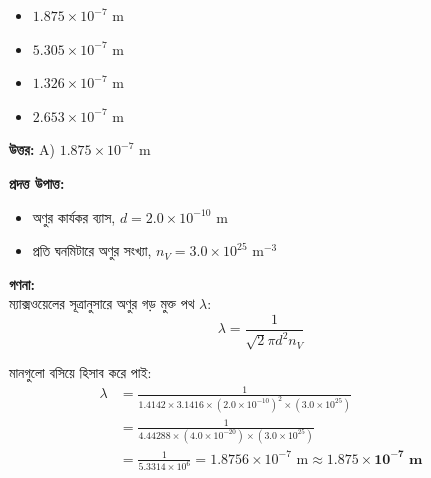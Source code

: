 \documentclass[12pt, a4paper]{article}
\begin{document}
\begin{itemize}[label={}, leftmargin=1cm, itemsep=0.5em]
    \item[\textbf{A)}] $1.875 \times 10^{-7}\text{ m}$
    \item[\textbf{B)}] $5.305 \times 10^{-7}\text{ m}$
    \item[\textbf{C)}] $1.326 \times 10^{-7}\text{ m}$
    \item[\textbf{D)}] $2.653 \times 10^{-7}\text{ m}$
\end{itemize}

\vspace{0.5em}
\begin{tcolorbox}[answerbox]
    \textbf{\color{success} উত্তর:} A) $1.875 \times 10^{-7}\text{ m}$
\end{tcolorbox}
\vspace{1em}

\begin{tcolorbox}[solutionbox={সমাধান (Solution)}]
    \noindent
    \textbf{প্রদত্ত উপাত্ত:}
    \begin{itemize}[leftmargin=1.5em, itemsep=0.2em]
        \item অণুর কার্যকর ব্যাস, $d = 2.0 \times 10^{-10}\text{ m}$
        \item প্রতি ঘনমিটারে অণুর সংখ্যা, $n_V = 3.0 \times 10^{25}\text{ m}^{-3}$
    \end{itemize}

    \vspace{0.6em}
    \noindent\textbf{গণনা:} \\
    ম্যাক্সওয়েলের সূত্রানুসারে অণুর গড় মুক্ত পথ $\lambda$:
    \[ \lambda = \frac{1}{\sqrt{2} \pi d^2 n_V} \]
    
    মানগুলো বসিয়ে হিসাব করে পাই:
    \begin{align*}
        \lambda &= \frac{1}{1.4142 \times 3.1416 \times (2.0 \times 10^{-10})^2 \times (3.0 \times 10^{25})} \\
        &= \frac{1}{4.44288 \times (4.0 \times 10^{-20}) \times (3.0 \times 10^{25})} \\
        &= \frac{1}{5.3314 \times 10^6} = 1.8756 \times 10^{-7}\text{ m} \approx \mathbf{1.875 \times 10^{-7}\text{ m}}
    \end{align*}
\end{tcolorbox}
\end{document}
